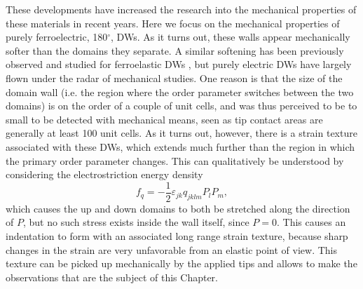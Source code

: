 These developments have increased the research into the mechanical properties of these materials in recent years. Here we focus on the mechanical properties of purely ferroelectric, 180$^\circ$, DWs.
As it turns out, these walls appear mechanically softer than the domains they separate.
A similar softening has been previously observed and studied for ferroelastic DWs \cite{Lee2003}, but purely electric DWs have largely flown under the radar of mechanical studies.
One reason is that the size of the domain wall (i.e. the region where the order parameter switches between the two domains) is on the order of a couple of unit cells, and was thus perceived to be to small to be detected with mechanical means, seen as tip contact areas are generally at least 100 unit cells.
As it turns out, however, there is a strain texture associated with these DWs, which extends much further than the region in which the primary order parameter changes.
This can qualitatively be understood by considering the electrostriction energy density
\begin{equation}
f_{q}=-\frac{1}{2}\varepsilon_{jk}q_{jklm}P_{l}P_{m},\label{eq:qpp}
\end{equation}
which causes the up and down domains to both be stretched along the direction of $P$, but no such stress exists inside the wall itself, since $P=0$.
This causes an indentation to form with an associated long range strain texture, because sharp changes in the strain are very unfavorable from an elastic point of view.
This texture can be picked up mechanically by the applied tips and allows to make the observations that are the subject of this Chapter.


